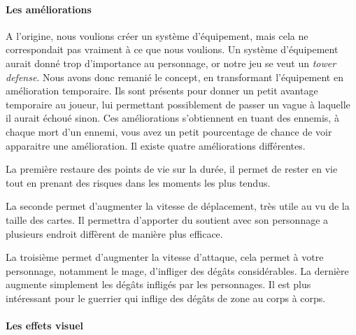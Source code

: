 \documentclass[a4paper, 12pt]{article}
\begin{document}
			\paragraph{Les améliorations}
			A l’origine, nous voulions créer un système d’équipement, mais cela ne correspondait pas vraiment à ce que nous voulions. Un système d’équipement aurait donné trop d’importance au personnage, or notre jeu se veut un \textit{tower defense}. Nous avons donc remanié le concept, en transformant l’équipement en amélioration temporaire. Ils sont présents pour donner un petit avantage temporaire au joueur, lui permettant possiblement de passer un vague à laquelle il aurait échoué sinon. Ces améliorations s’obtiennent en tuant des ennemis, à chaque mort d’un ennemi, vous avez un petit pourcentage de chance de voir apparaitre une amélioration. Il existe quatre améliorations différentes.
\par La premi\`ere restaure des points de vie sur la durée, il permet de rester en vie tout en prenant des risques dans les moments les plus tendus.
\par La seconde permet d’augmenter la vitesse de déplacement, très utile au vu de la taille des cartes. Il permettra d’apporter du soutient avec son personnage a plusieurs endroit diffèrent de manière plus efficace.
\par La troisième permet d’augmenter la vitesse d’attaque, cela permet à votre personnage, notamment le mage, d’infliger des dégâts considérables.
La derni\`ere augmente simplement les dégâts infligés par les personnages. Il est plus intéressant pour le guerrier qui inflige des dégâts de zone au corps à corps.

			\paragraph{Les effets visuel}
			
\end{document}
